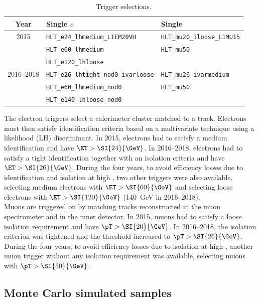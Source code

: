 \begin{table}[htbp]
	\centering
	\footnotesize
	\label{tab:samples:trig}
	\begin{tabular}{cll}
		\toprule
		Year & \multicolumn{1}{l}{Single $e$} & \multicolumn{1}{l}{Single \Pgm} \\
		\midrule
		2015 & \texttt{HLT\_e24\_lhmedium\_L1EM20VH} & \texttt{HLT\_mu20\_iloose\_L1MU15} \\
		& \texttt{HLT\_e60\_lhmedium} & \texttt{HLT\_mu50} \\
		& \texttt{HLT\_e120\_lhloose} & \\
		\midrule
		2016--2018 & \texttt{HLT\_e26\_lhtight\_nod0\_ivarloose} & \texttt{HLT\_mu26\_ivarmedium} \\
		& \texttt{HLT\_e60\_lhmedium\_nod0} & \texttt{HLT\_mu50} \\
		& \texttt{HLT\_e140\_lhloose\_nod0} & \\
		\bottomrule
	\end{tabular}
	\caption{Trigger selections.}%
\end{table}

\noindent The electron triggers select a calorimeter cluster matched to a track.
Electrons must then satisfy identification criteria based on a multivariate technique using a likelihood (LH) discriminant.
In 2015, electrons had to satisfy a medium identification and have $\ET > \SI{24}{\GeV}$.
In 2016--2018, electrons had to satisfy a tight identification
together with an isolation criteria and have $\ET > \SI{26}{\GeV}$.
During the four years, to avoid efficiency losses due to identification and isolation at high \pT, 
two other triggers were also available,
selecting medium electrons with $\ET > \SI{60}{\GeV}$
and selecting loose electrons with $\ET > \SI{120}{\GeV}$ (\SI{140}{\GeV} in 2016--2018).\\
Muons are triggered on by matching tracks reconstructed in the muon spectrometer and in the inner detector.
In 2015, muons had to satisfy a loose isolation requirement and have $\pT >\SI{20}{\GeV}$. In 2016--2018, the isolation criterion was tightened and the threshold increased to $\pT >\SI{26}{\GeV}$.
During the four years, to avoid efficiency losses due to isolation at high \pT,
another muon trigger without any isolation requirement was available,
selecting muons with $\pT > \SI{50}{\GeV}$. 

\subsection{Monte Carlo simulated samples}%
\label{sec:samples:mc}

